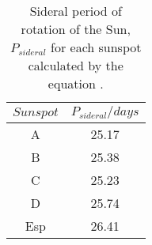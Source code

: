 \begin{table}[H]
	\centering
	\begin{tabular}{ c c}
		\hline
		\centering
			$Sunspot$ & $P_{sideral}/days$ \\\hline
			A & 25.17 \\
			B & 25.38 \\
			C & 25.23 \\
			D & 25.74 \\
			Esp & 26.41 \\\hline
	\end{tabular}
	\caption{\label{Tab:Sideral}Sideral period of rotation of the Sun, $P_{sideral}$ for each sunspot calculated by the equation \label{eq:Sideral}.}
\end{table}
